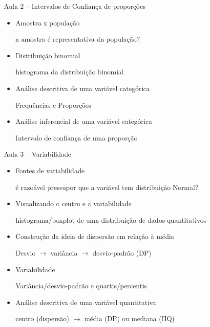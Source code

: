 \documentclass{beamer}
\begin{document}
\begin{frame}{\scriptsize Aula 2 -- Intervalos de Confiança de proporções}
  \begin{itemize}
    \footnotesize
  \item Amostra x população

    {\tiny a amostra é representativa da população?}
    \bigskip
  \item Distribuição binomial

    {\tiny histograma da distribuição binomial}
    \bigskip
  \item Análise descritiva de uma variável categórica

    {\tiny Frequências e Proporções}
    \bigskip
  \item Análise inferencial de uma variável categórica

    {\tiny Intervalo de confiança de uma proporção}
  \end{itemize}
\end{frame}

\begin{frame}{\scriptsize Aula 3 -- Variabilidade}
  \begin{itemize}
    \footnotesize
  \item Fontes de variabilidade

    {\tiny é razoável pressupor que a variável tem distribuição Normal?}
    \bigskip
  \item Visualizando o centro e a variabilidade

    {\tiny histograma/boxplot de uma distribuição de dados quantitativos}
    \bigskip
  \item Construção da ideia de dispersão em relação à média

    {\tiny Desvio $\rightarrow$ variância $\rightarrow$ desvio-padrão (DP)}
    \bigskip
  \item Variabilidade

    {\tiny Variância/desvio-padrão e quartis/percentis}
    \bigskip
  \item Análise descritiva de uma variável quantitativa

    {\tiny centro (dispersão) $\rightarrow$ média (DP) ou mediana (IIQ)}
  \end{itemize}
\end{frame}
\end{document}

